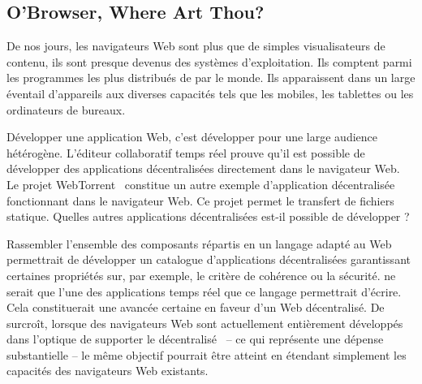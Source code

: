 

\subsection{O'Browser, Where Art Thou?}

De nos jours, les navigateurs Web sont plus que de simples visualisateurs de
contenu, ils sont presque devenus des systèmes d'exploitation. Ils comptent
parmi les programmes les plus distribués de par le monde. Ils apparaissent dans
un large éventail d'appareils aux diverses capacités tels que les mobiles, les
tablettes ou les ordinateurs de bureaux.

Développer une application Web, c'est développer pour une large audience
hétérogène.  L'éditeur collaboratif temps réel \CRATE prouve qu'il est possible
de développer des applications décentralisées directement dans le navigateur
Web. Le projet WebTorrent~\cite{webtorrent} constitue un autre exemple
d'application décentralisée fonctionnant dans le navigateur Web. Ce projet
permet le transfert de fichiers statique. Quelles autres applications
décentralisées est-il possible de développer ?

Rassembler l'ensemble des composants répartis en un langage adapté au Web
permettrait de développer un catalogue d'applications décentralisées
garantissant certaines propriétés sur, par exemple, le critère de cohérence ou
la sécurité. \CRATE ne serait que l'une des applications temps réel que ce
langage permettrait d'écrire. Cela constituerait une avancée certaine en faveur
d'un Web décentralisé. De surcroît, lorsque des navigateurs Web sont
actuellement entièrement développés dans l'optique de supporter le
décentralisé~\cite{maelstrom} -- ce qui représente une dépense substantielle --
le même objectif pourrait être atteint en étendant simplement les capacités des
navigateurs Web existants.


